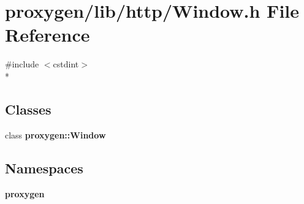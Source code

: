 \section{proxygen/lib/http/\+Window.h File Reference}
\label{Window_8h}
{\ttfamily \#include $<$cstdint$>$}\\*
\subsection*{Classes}
\begin{DoxyCompactItemize}
\item 
class {\bf proxygen\+::\+Window}
\end{DoxyCompactItemize}
\subsection*{Namespaces}
\begin{DoxyCompactItemize}
\item 
 {\bf proxygen}
\end{DoxyCompactItemize}
